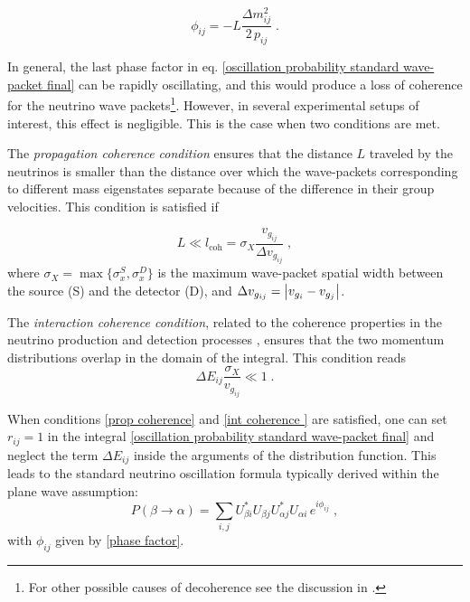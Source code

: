 \documentclass[11pt]{article}
\begin{document}
\begin{equation}\label{phase factor}
     \phi_{ij} = - L\frac{\Delta m^2_{ij}}{2\,p_{ij}}\;.
\end{equation}


In general, the last phase factor in eq. \eqref{oscillation probability standard wave-packet final} can be rapidly oscillating, and this would produce a loss of coherence for the neutrino wave packets\footnote{For other possible causes of decoherence see the discussion in \cite{Ohlsson:2000mj}.}. However, in several experimental setups of interest, this effect is negligible. This is the case when two conditions are met. 

The \emph{propagation coherence condition} ensures that the distance $L$ traveled by the neutrinos is smaller than the distance over which the wave-packets corresponding to different mass eigenstates separate because of the difference in their group velocities. This condition is satisfied if

\begin{equation}
    L \ll l_{\text{coh}} = \sigma_X\frac{v_{g_{ij}}}{\Delta v_{g_{ij}}}\;, \label{prop coherence}
\end{equation}
where $\sigma_X=\max \Big\{\sigma_{x}^S,\sigma_{x}^D\Big\}$ is the maximum wave-packet spatial width between the source (S) and the detector (D), and $\Delta v_{g_{ij}} = \abs{v_{g_i}-v_{g_j}}$.

The \emph{interaction coherence condition}, related to the coherence properties in the neutrino
production and detection processes \cite{Akhmedov:2009rb}, ensures that the two momentum distributions overlap in the domain of the integral. This condition reads
\begin{equation}\label{int coherence }
    \Delta E_{ij}\frac{\sigma_X}{v_{g_{ij}}} \ll 1\;.
\end{equation}


When conditions \eqref{prop coherence} and \eqref{int coherence } are satisfied, one can set $r_{ij}=1$ in the integral \eqref{oscillation probability standard wave-packet final} and neglect the term $\Delta E_{ij}$ inside the arguments of the distribution function. This leads to the standard neutrino oscillation formula typically derived within the plane wave assumption:
\begin{equation}\label{eq:oscillation standard}
     P(\beta\to\alpha) = \sum_{i,j} U^*_{\beta i} U_{\beta j} U^*_{\alpha j} U_{\alpha i}\,e^{i\phi_{ij}}\;,
\end{equation}
with $\phi_{ij}$ given by \eqref{phase factor}.
\end{document}
